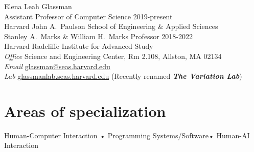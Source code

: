 \documentclass[10pt, a4paper]{article}
\begin{document}
{\LARGE Elena Leah Glassman}\\[0.25cm]
{\large Assistant Professor of Computer Science \hfill 2019-present\\ 
Harvard John A.~Paulson School of Engineering \& Applied Sciences\\
[0.1cm]
Stanley A.~Marks \& William H.~Marks Professor \hfill 2018-2022 \\
Harvard Radcliffe Institute for Advanced Study}\\[0.4cm]
\textit{Office} Science and Engineering Center, Rm 2.108, Allston, MA 02134\\%
\textit{Email} \href{mailto:glassman@seas.harvard.edu}{glassman@seas.harvard.edu} \\
\textit{Lab} \href{http://glassmanlab.seas.harvard.edu/}{glassmanlab.seas.harvard.edu} (Recently renamed \textit{\textbf{The Variation Lab}})

\section*{Areas of specialization}
Human-Computer Interaction • Programming Systems/Software• Human-AI Interaction
\end{document}
